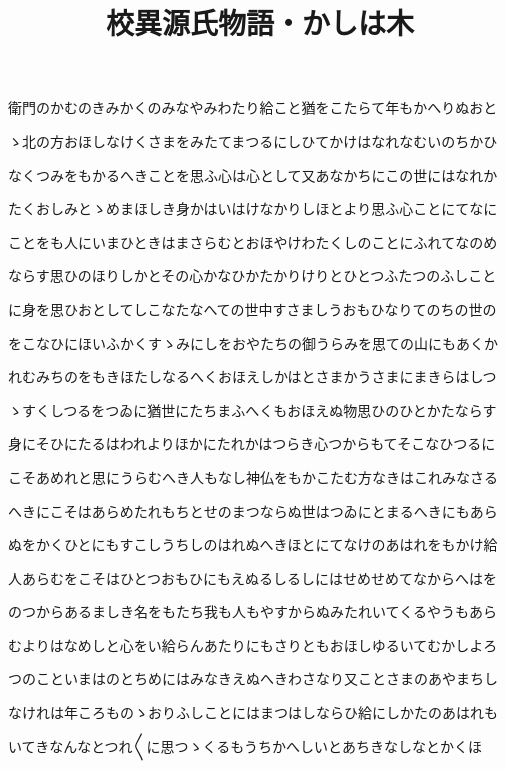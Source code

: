 \documentclass[a4paper,11pt,landscape]{ltjtarticle}
\title{校異源氏物語・かしは木}
\date{}
\begin{document}
\maketitle

衛門のかむのきみかくのみなやみわたり給こと猶をこたらて年もかへりぬおと
\par\medskip
ゝ北の方おほしなけくさまをみたてまつるにしひてかけはなれなむいのちかひ
\par\medskip
なくつみをもかるへきことを思ふ心は心として又あなかちにこの世にはなれか
\par\medskip
たくおしみとゝめまほしき身かはいはけなかりしほとより思ふ心ことにてなに
\par\medskip
ことをも人にいまひときはまさらむとおほやけわたくしのことにふれてなのめ
\par\medskip
ならす思ひのほりしかとその心かなひかたかりけりとひとつふたつのふしこと
\par\medskip
に身を思ひおとしてしこなたなへての世中すさましうおもひなりてのちの世の
\par\medskip
をこなひにほいふかくすゝみにしをおやたちの御うらみを思ての山にもあくか
\par\medskip
れむみちのをもきほたしなるへくおほえしかはとさまかうさまにまきらはしつ
\par\medskip
ゝすくしつるをつゐに猶世にたちまふへくもおほえぬ物思ひのひとかたならす
\par\medskip
身にそひにたるはわれよりほかにたれかはつらき心つからもてそこなひつるに
\par\medskip
こそあめれと思にうらむへき人もなし神仏をもかこたむ方なきはこれみなさる
\par\medskip
へきにこそはあらめたれもちとせのまつならぬ世はつゐにとまるへきにもあら
\par\medskip
ぬをかくひとにもすこしうちしのはれぬへきほとにてなけのあはれをもかけ給
\par\medskip
人あらむをこそはひとつおもひにもえぬるしるしにはせめせめてなからへはを
\par\medskip
のつからあるましき名をもたち我も人もやすからぬみたれいてくるやうもあら
\par\medskip
むよりはなめしと心をい給らんあたりにもさりともおほしゆるいてむかしよろ
\par\medskip
つのこといまはのとちめにはみなきえぬへきわさなり又ことさまのあやまちし
\par\medskip
なけれは年ころものゝおりふしことにはまつはしならひ給にしかたのあはれも
\par\medskip
いてきなんなとつれ〱に思つゝくるもうちかへしいとあちきなしなとかくほ
\end{document}
